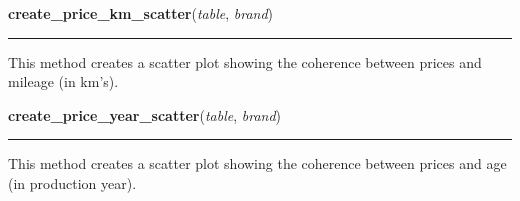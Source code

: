     \label{BilbasenDataMining:graphics:create_price_km_scatter}

    \vspace{0.5ex}

\hspace{.8\funcindent}\begin{boxedminipage}{\funcwidth}

    \raggedright \textbf{create\_price\_km\_scatter}(\textit{table}, \textit{brand})

    \vspace{-1.5ex}

    \rule{\textwidth}{0.5\fboxrule}
\setlength{\parskip}{2ex}
    This method creates a scatter plot showing the coherence between prices
    and mileage (in km's).

\setlength{\parskip}{1ex}
    \end{boxedminipage}

    \label{BilbasenDataMining:graphics:create_price_year_scatter}

    \vspace{0.5ex}

\hspace{.8\funcindent}\begin{boxedminipage}{\funcwidth}

    \raggedright \textbf{create\_price\_year\_scatter}(\textit{table}, \textit{brand})

    \vspace{-1.5ex}

    \rule{\textwidth}{0.5\fboxrule}
\setlength{\parskip}{2ex}
    This method creates a scatter plot showing the coherence between prices
    and age (in production year).

\setlength{\parskip}{1ex}
    \end{boxedminipage}

    \label{BilbasenDataMining:graphics:create_distribution_plot}

    \vspace{0.5ex}

